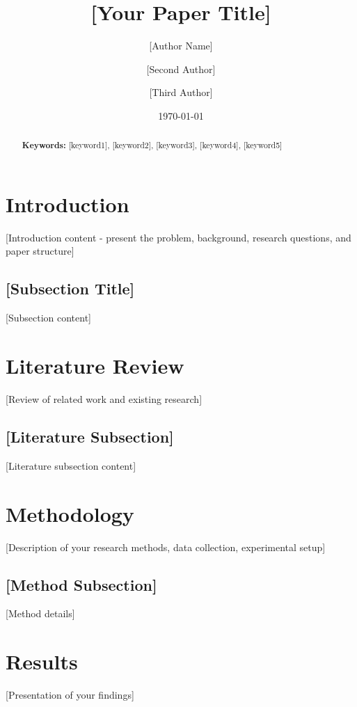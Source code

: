 \documentclass[12pt,a4paper]{article}
\title{[Your Paper Title]}
\author{[Author Name] \and [Second Author] \and [Third Author]}
\date{\today}
\begin{document}
\maketitle
\thispagestyle{empty}

\begin{abstract}
\setlength{\parindent}{0pt}

\textbf{Keywords:} [keyword1], [keyword2], [keyword3], [keyword4], [keyword5]
\end{abstract}

\newpage
\tableofcontents
\newpage

\twocolumn
\section{Introduction}
[Introduction content - present the problem, background, research questions, and paper structure]

\subsection{[Subsection Title]}
[Subsection content]

\section{Literature Review}
[Review of related work and existing research]

\subsection{[Literature Subsection]}
[Literature subsection content]

\section{Methodology}
[Description of your research methods, data collection, experimental setup]

\subsection{[Method Subsection]}
[Method details]

\section{Results}
[Presentation of your findings]
\end{document}
